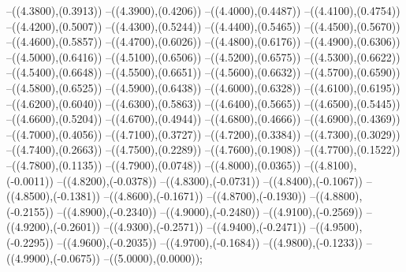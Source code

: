 {	--({\sx*(4.3800)},{\sy*(0.3913)})
	--({\sx*(4.3900)},{\sy*(0.4206)})
	--({\sx*(4.4000)},{\sy*(0.4487)})
	--({\sx*(4.4100)},{\sy*(0.4754)})
	--({\sx*(4.4200)},{\sy*(0.5007)})
	--({\sx*(4.4300)},{\sy*(0.5244)})
	--({\sx*(4.4400)},{\sy*(0.5465)})
	--({\sx*(4.4500)},{\sy*(0.5670)})
	--({\sx*(4.4600)},{\sy*(0.5857)})
	--({\sx*(4.4700)},{\sy*(0.6026)})
	--({\sx*(4.4800)},{\sy*(0.6176)})
	--({\sx*(4.4900)},{\sy*(0.6306)})
	--({\sx*(4.5000)},{\sy*(0.6416)})
	--({\sx*(4.5100)},{\sy*(0.6506)})
	--({\sx*(4.5200)},{\sy*(0.6575)})
	--({\sx*(4.5300)},{\sy*(0.6622)})
	--({\sx*(4.5400)},{\sy*(0.6648)})
	--({\sx*(4.5500)},{\sy*(0.6651)})
	--({\sx*(4.5600)},{\sy*(0.6632)})
	--({\sx*(4.5700)},{\sy*(0.6590)})
	--({\sx*(4.5800)},{\sy*(0.6525)})
	--({\sx*(4.5900)},{\sy*(0.6438)})
	--({\sx*(4.6000)},{\sy*(0.6328)})
	--({\sx*(4.6100)},{\sy*(0.6195)})
	--({\sx*(4.6200)},{\sy*(0.6040)})
	--({\sx*(4.6300)},{\sy*(0.5863)})
	--({\sx*(4.6400)},{\sy*(0.5665)})
	--({\sx*(4.6500)},{\sy*(0.5445)})
	--({\sx*(4.6600)},{\sy*(0.5204)})
	--({\sx*(4.6700)},{\sy*(0.4944)})
	--({\sx*(4.6800)},{\sy*(0.4666)})
	--({\sx*(4.6900)},{\sy*(0.4369)})
	--({\sx*(4.7000)},{\sy*(0.4056)})
	--({\sx*(4.7100)},{\sy*(0.3727)})
	--({\sx*(4.7200)},{\sy*(0.3384)})
	--({\sx*(4.7300)},{\sy*(0.3029)})
	--({\sx*(4.7400)},{\sy*(0.2663)})
	--({\sx*(4.7500)},{\sy*(0.2289)})
	--({\sx*(4.7600)},{\sy*(0.1908)})
	--({\sx*(4.7700)},{\sy*(0.1522)})
	--({\sx*(4.7800)},{\sy*(0.1135)})
	--({\sx*(4.7900)},{\sy*(0.0748)})
	--({\sx*(4.8000)},{\sy*(0.0365)})
	--({\sx*(4.8100)},{\sy*(-0.0011)})
	--({\sx*(4.8200)},{\sy*(-0.0378)})
	--({\sx*(4.8300)},{\sy*(-0.0731)})
	--({\sx*(4.8400)},{\sy*(-0.1067)})
	--({\sx*(4.8500)},{\sy*(-0.1381)})
	--({\sx*(4.8600)},{\sy*(-0.1671)})
	--({\sx*(4.8700)},{\sy*(-0.1930)})
	--({\sx*(4.8800)},{\sy*(-0.2155)})
	--({\sx*(4.8900)},{\sy*(-0.2340)})
	--({\sx*(4.9000)},{\sy*(-0.2480)})
	--({\sx*(4.9100)},{\sy*(-0.2569)})
	--({\sx*(4.9200)},{\sy*(-0.2601)})
	--({\sx*(4.9300)},{\sy*(-0.2571)})
	--({\sx*(4.9400)},{\sy*(-0.2471)})
	--({\sx*(4.9500)},{\sy*(-0.2295)})
	--({\sx*(4.9600)},{\sy*(-0.2035)})
	--({\sx*(4.9700)},{\sy*(-0.1684)})
	--({\sx*(4.9800)},{\sy*(-0.1233)})
	--({\sx*(4.9900)},{\sy*(-0.0675)})
	--({\sx*(5.0000)},{\sy*(0.0000)});
}
